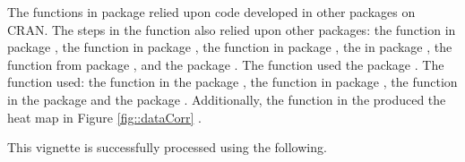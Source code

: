 The functions in  package relied upon code developed in other
packages on CRAN. The steps in the  function also
relied upon other packages: the  function in
 package \citep{ghalanosRsolnpGeneralNonLinear2015}, the
 function in  package
\citep[pg.~2]{marschnerGlm2FittingGeneralized2011}, the
 function in  package
\citep{renRlistToolboxNonTabular2016}, the  in
 package \citep{harrellHmiscHarrellMiscellaneous2020},
the  function from  package
\citep{wickhamTidyrEasilyTidy2020}, and the  package
\citep{wickhamGgplot2ElegantGraphics2016}. The 
function used the  package
\citep{therneauPackageSurvivalAnalysis2015}. The
 function used: the
 function in the  package
\citep{kahleInvgammaInverseGamma2017}, the  function
in  package
\citep{mersmannTruncnormTruncatedNormal2020}, the 
function in the  package
\citep{henryPurrrFunctionalProgramming2020a} and the  package
\citep{plummerCODAConvergenceDiagnosis2006}. Additionally, the
 function in the  produced the heat map
in Figure \ref{fig::dataCorr}
\citep{schloerkeGGallyExtensionGgplot22020}.

This vignette is successfully processed using the following.

